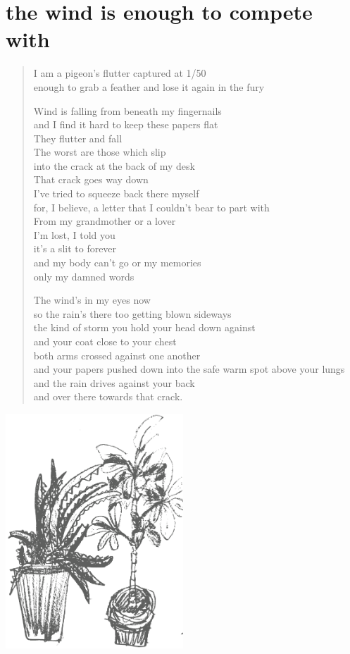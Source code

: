\documentclass[10pt,a6paper,footinclude=false,firstfoot=false,headinclude=true,open=any,DIV=6]{scrbook} %
\begin{document}
\chapter{the wind is enough to compete with}

\begin{verse}
I am a pigeon's flutter captured at 1/50 \\
enough to grab a feather and lose it again in the fury 

Wind is falling from beneath my fingernails \\
and I find it hard to keep these papers flat \\
They flutter and fall \\
The worst are those which slip \\
into the crack at the back of my desk \\
That crack goes way down \\
I've tried to squeeze back there myself \\
for, I believe, a letter that I couldn't bear to part with \\
From my grandmother or a lover \\
I'm lost, I told you \\
it's a slit to forever \\
and my body can't go or my memories \\
only my damned words 

The wind's in my eyes now \\
so the rain's there too getting blown sideways \\
the kind of storm you hold your head down against \\
and your coat close to your chest \\
both arms crossed against one another \\
and your papers pushed down into the safe warm spot above your lungs \\
and the rain drives against your back \\
and over there towards that crack. 
\end{verse}

\vspace{1em}
\begin{center}
\noindent\includegraphics[width=0.5\textwidth]{FernsVec.png}
\end{center}
\end{document}
